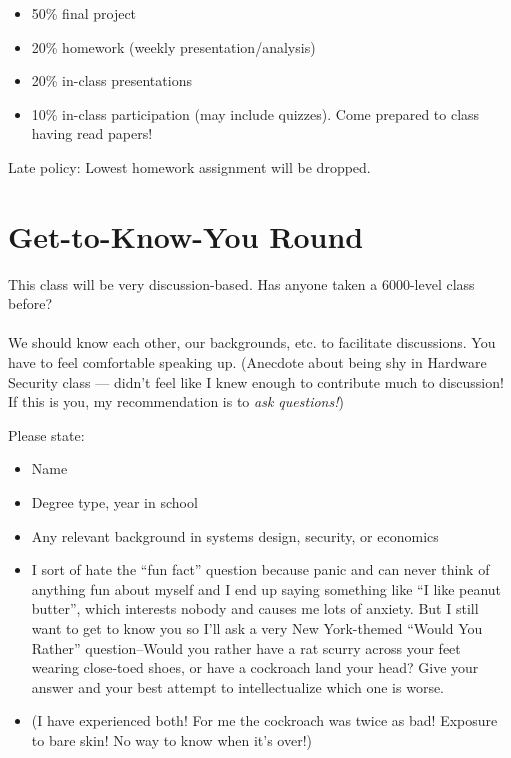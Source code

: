 \documentclass[11pt]{article}
\begin{document}
\begin{itemize}
    \item 50\% final project 
    \item 20\% homework (weekly presentation/analysis)
    \item 20\% in-class presentations
    \item 10\% in-class participation (may include quizzes). Come prepared to class having read papers! 
\end{itemize}

Late policy: Lowest homework assignment will be dropped. 

\section{Get-to-Know-You Round}

This class will be very discussion-based. Has anyone taken a 6000-level class before?
\\ \\ 
We should know each other, our backgrounds, etc. to facilitate discussions. You have to feel comfortable speaking up. (Anecdote about being shy in Hardware Security class --- didn't feel like I knew enough to contribute much to discussion! If this is you, my recommendation is to {\it ask questions!})

Please state:

\begin{itemize}
    \item Name
    \item Degree type, year in school
    \item Any relevant background in systems design, security, or economics
    \item I sort of hate the ``fun fact'' question because panic and can never think of anything fun about myself and I end up saying something like ``I like peanut butter'', which interests nobody and causes me lots of anxiety. 
    But I still want to get to know you so I'll ask a very New York-themed ``Would You Rather'' question--Would you rather have a rat scurry across your feet wearing close-toed shoes, or have a cockroach land your head? Give your answer and your best attempt to intellectualize which one is worse. 
    \item (I have experienced both! For me the cockroach was twice as bad! Exposure to bare skin! No way to know when it's over!)
\end{itemize}
\end{document}
